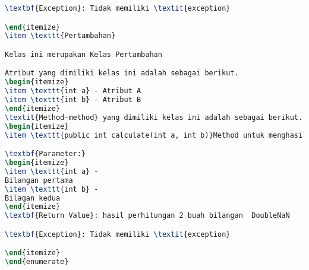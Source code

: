 \begin{lstlisting}[language=TeX, caption=Hasil pengujian kode program sederhana]
\textbf{Exception}: Tidak memiliki \textit{exception}

\end{itemize}
\item \texttt{Pertambahan}

Kelas ini merupakan Kelas Pertambahan

Atribut yang dimiliki kelas ini adalah sebagai berikut.
\begin{itemize}
\item \texttt{int a} - Atribut A
\item \texttt{int b} - Atribut B
\end{itemize}
\textit{Method-method} yang dimiliki kelas ini adalah sebagai berikut.
\begin{itemize}
\item \texttt{public int calculate(int a, int b)}Method untuk menghasilkan perhitungan 2 buah bilangan

\textbf{Parameter:}
\begin{itemize}
\item \texttt{int a} - 
Bilangan pertama
\item \texttt{int b} - 
Bilagan kedua
\end{itemize}
\textbf{Return Value}: hasil perhitungan 2 buah bilangan  DoubleNaN

\textbf{Exception}: Tidak memiliki \textit{exception}

\end{itemize}
\end{enumerate}

\end{lstlisting}

